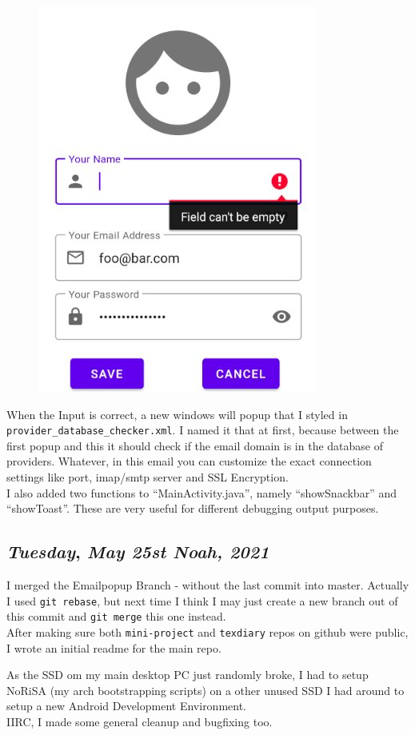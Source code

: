 \begin{figure}[H]
\centering
\includegraphics[height=.3\textheight]{media/newemail}
\end{figure}

When the Input is correct, a new windows will popup that I styled in \texttt{provider\_database\_checker.xml}. I named it that at first, because between the first popup and this it should check if the email domain is in the database of providers. Whatever, in this email you can customize the exact connection settings like port, imap/smtp server and SSL Encryption.\\

I also added two functions to ``MainActivity.java'', namely ``showSnackbar'' and ``showToast''. These are very useful for different debugging output purposes.

\def\day{\textit{May 25st Noah, 2021}}
\def\weekday{\textit{Tuesday}}
\subsection*{\weekday, \day}

I merged the Emailpopup Branch - without the last commit into master. Actually I used \texttt{git rebase}, but next time I think I may just create a new branch out of this commit and \texttt{git merge} this one instead.\\

After making sure both \texttt{mini-project} and \texttt{texdiary} repos on github were public, I wrote an initial readme for the main repo.

As the SSD om my main desktop PC just randomly broke, I had to setup NoRiSA (my arch bootstrapping scripts) on a other unused SSD I had around to setup a new Android Development Environment.\\

IIRC, I made some general cleanup and bugfixing too.
